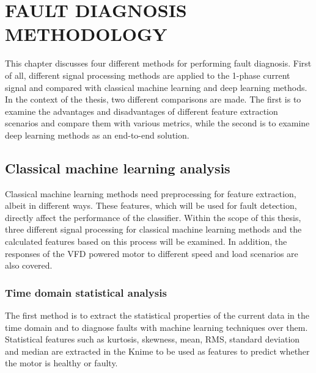\chapter{FAULT DIAGNOSIS METHODOLOGY}\label{Ch4}
This chapter discusses four different methods for performing fault diagnosis. First of all, different signal processing methods are applied to the 1-phase current signal and compared with classical machine learning and deep learning methods. In the context of the thesis, two different comparisons are made. The first is to examine the advantages and disadvantages of different feature extraction scenarios and compare them with various metrics, while the second is to examine deep learning methods as an end-to-end solution.
\section{Classical machine learning analysis}
Classical machine learning methods need preprocessing for feature extraction, albeit in different ways. These features, which will be used for fault detection, directly affect the performance of the classifier. Within the scope of this thesis, three different signal processing for classical machine learning methods and the calculated features based on this process will be examined. In addition, the responses of the VFD powered motor to different speed and load scenarios are also covered.
\subsection{Time domain statistical analysis}
The first method is to extract the statistical properties of the current data in the time domain and to diagnose faults with machine learning techniques over them. Statistical features such as kurtosis, skewness, mean, RMS, standard deviation and median are extracted in the Knime to be used as features to predict whether the motor is healthy or faulty. 

